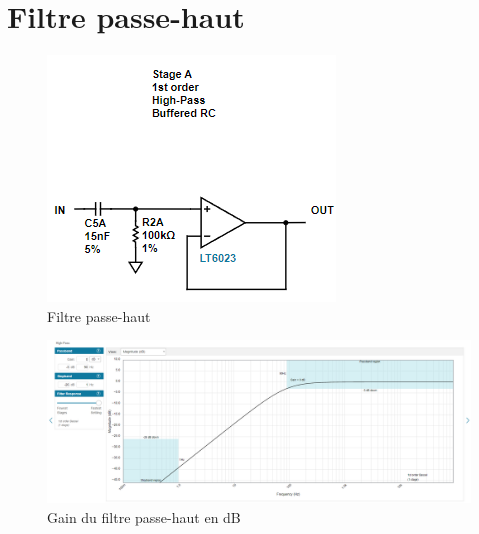 % 
% 

\section{Filtre passe-haut} \label{hfilterannexe}
\begin{figure}[H]
    \centering
    \includegraphics{Pictures/highpassfilter.png}
    \caption{Filtre passe-haut}
    \label{fig:highpassfilterannexe}
\end{figure}


\begin{figure}[H]
    \centering
    \includegraphics[width=1.5\textwidth,angle=90,origin=c]{Pictures/highpassspecs.png}
    \caption{Gain du filtre passe-haut en dB}
    \label{fig:highpassfiltermagnannexe}
\end{figure}

\newpage
